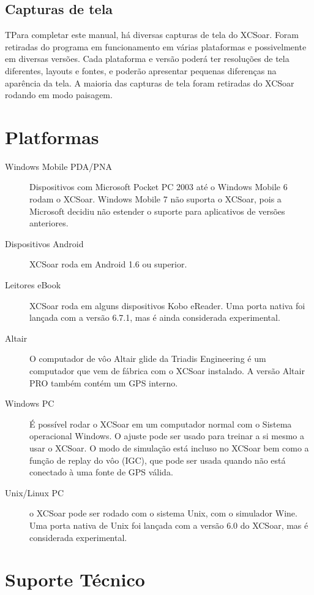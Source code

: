 \subsection*{Capturas de tela}
TPara completar este manual, há diversas capturas de tela do XCSoar.  Foram retiradas do programa em funcionamento em várias plataformas e possivelmente em diversas versões.  Cada plataforma e versão poderá ter resoluções de tela diferentes, layouts e fontes, e poderão apresentar pequenas diferenças na aparência da tela.  A maioria das capturas de tela foram retiradas do XCSoar rodando em modo paisagem.

\section{Platformas}
\begin{description}
\item[Windows Mobile PDA/PNA]
Dispositivos com Microsoft Pocket PC 2003 até o Windows Mobile 6 rodam o XCSoar.   Windows Mobile 7 não suporta o XCSoar, pois a Microsoft decidiu não estender o suporte para aplicativos de versões anteriores.
\item[Dispositivos Android]
XCSoar roda em Android 1.6 ou superior.
\item [Leitores eBook]
XCSoar roda em alguns dispositivos Kobo eReader.  Uma porta nativa foi lançada com a versão 6.7.1, mas é ainda considerada experimental.
\item[Altair]
O computador de vôo Altair glide da Triadis Engineering é um computador que vem de fábrica com o XCSoar instalado.  A versão Altair PRO também contém um GPS interno.
\item[Windows PC]
É possível rodar o XCSoar em um computador normal com o Sistema operacional Windows.  O ajuste pode ser usado para treinar a si mesmo a usar o XCSoar.  O modo de simulação está incluso no XCSoar bem como a função de replay do vôo (IGC), que pode ser usada quando não está conectado à uma fonte de GPS válida.
\item[Unix/Linux PC]
o XCSoar pode ser rodado com o sistema Unix, com o simulador Wine.  Uma porta nativa de Unix foi lançada com a versão 6.0 do XCSoar, mas é considerada experimental.
\end{description}



\section{Suporte Técnico}

